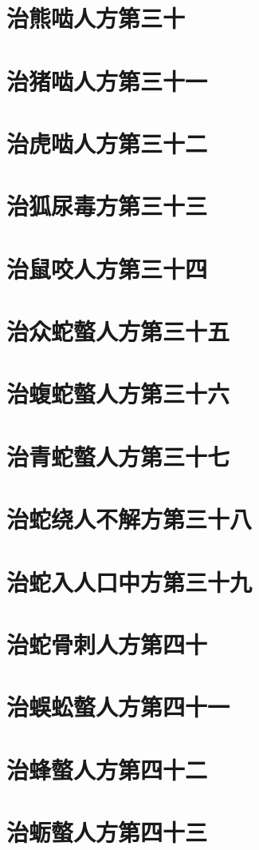 \documentclass[a4paper,12pt,UTF8,twoside]{ctexbook}
\begin{document}
\chapter{治熊啮人方第三十}
\chapter{治猪啮人方第三十一}
\chapter{治虎啮人方第三十二}
\chapter{治狐尿毒方第三十三}
\chapter{治鼠咬人方第三十四}
\chapter{治众蛇螫人方第三十五}
\chapter{治蝮蛇螫人方第三十六}
\chapter{治青蛇螫人方第三十七}
\chapter{治蛇绕人不解方第三十八}
\chapter{治蛇入人口中方第三十九}
\chapter{治蛇骨刺人方第四十}
\chapter{治蜈蚣螫人方第四十一}
\chapter{治蜂螫人方第四十二}
\chapter{治蛎螫人方第四十三}
\end{document}
